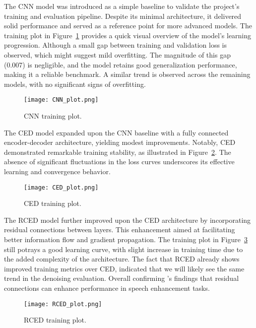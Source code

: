The CNN model was introduced as a simple baseline to validate the project’s training and evaluation pipeline. Despite its minimal architecture, it delivered solid performance and served as a reference point for more advanced models. The training plot in Figure~\ref{fig:cnn_training_plot} provides a quick visual overview of the model's learning progression. Although a small gap between training and validation loss is observed, which might suggest mild overfitting. The magnitude of this gap (0.007) is negligible, and the model retains good generalization performance, making it a reliable benchmark. A similar trend is observed across the remaining models, with no significant signs of overfitting.

\begin{figure}[H]
    \centering
    \texttt{[image: CNN\_plot.png]}
    \caption{\label{fig:cnn_training_plot} CNN training plot.}
\end{figure}

The CED model expanded upon the CNN baseline with a fully connected encoder-decoder architecture, yielding modest improvements. Notably, CED demonstrated remarkable training stability, as illustrated in Figure~\ref{fig:ced_training_plot}. The absence of significant fluctuations in the loss curves underscores its effective learning and convergence behavior.

\begin{figure}[H]
    \centering
    \texttt{[image: CED\_plot.png]}
    \caption{\label{fig:ced_training_plot} CED training plot.}
\end{figure}

The RCED model further improved upon the CED architecture by incorporating residual connections between layers. This enhancement aimed at facilitating better information flow and gradient propagation. The training plot in Figure~\ref{fig:rced_training_plot} still potrays a good learning curve, with slight increase in training time due to the added complexity of the architecture. The fact that RCED already shows improved training metrics over CED, indicated that we will likely see the same trend in the denoising evaluation. Overall confirming \cite{park2017acoustic}’s findings that residual connections can enhance performance in speech enhancement tasks.

\begin{figure}[H]
    \centering
    \texttt{[image: RCED\_plot.png]}
    \caption{\label{fig:rced_training_plot} RCED training plot.}
\end{figure}

